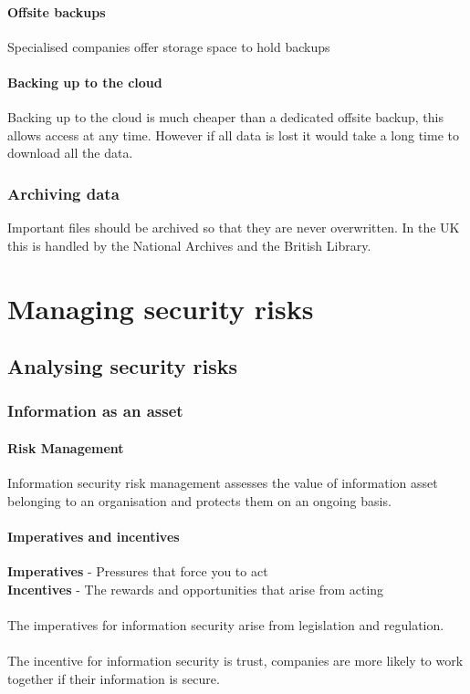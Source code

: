 \documentclass{article}[18pt]
\begin{document}
\paragraph{Offsite backups}
Specialised companies offer storage space to hold backups
\paragraph{Backing up to the cloud}
Backing up to the cloud is much cheaper than a dedicated offsite backup, this allows access at any time. However if all data is lost it would take a long time to download all the data.
\subsubsection{Archiving data}
Important files should be archived so that they are never overwritten. In the UK this is handled by the National Archives and the British Library.
\section{Managing security risks}
\subsection{Analysing security risks}
\subsubsection{Information as an asset}
\paragraph{Risk Management}
Information security risk management assesses the value of information asset belonging to an organisation and protects them on an ongoing basis.\\
\paragraph{Imperatives and incentives}
\textbf{Imperatives} - Pressures that force you to act\\
\textbf{Incentives} - The rewards and opportunities that arise from acting\\
\\
The imperatives for information security arise from legislation and regulation.\\
\\
The incentive for information security is trust, companies are more likely to work together if their information is secure.
\end{document}
